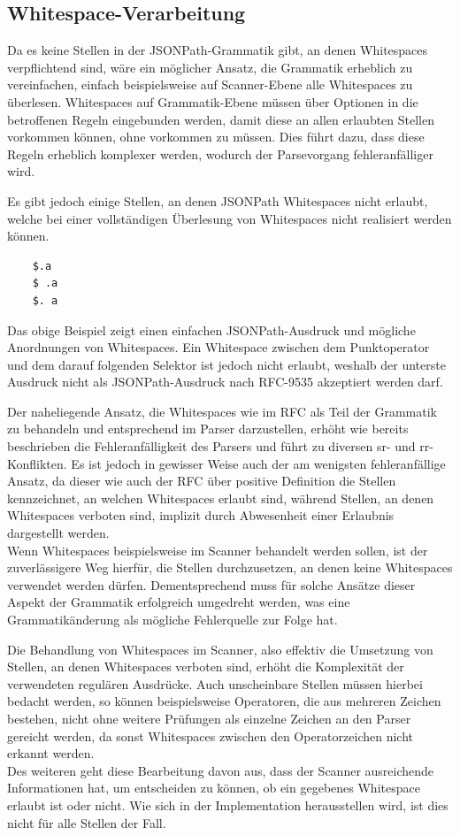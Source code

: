 \documentclass[oneside]{ausarbeitung}
\begin{document}
\subsection{Whitespace-Verarbeitung}

Da es keine Stellen in der JSONPath-Grammatik gibt, an denen Whitespaces verpflichtend sind, wäre ein möglicher Ansatz, die Grammatik erheblich zu vereinfachen, einfach beispielsweise auf Scanner-Ebene alle Whitespaces zu überlesen. Whitespaces auf Grammatik-Ebene müssen über Optionen in die betroffenen Regeln eingebunden werden, damit diese an allen erlaubten Stellen vorkommen können, ohne vorkommen zu müssen. Dies führt dazu, dass diese Regeln erheblich komplexer werden, wodurch der Parsevorgang fehleranfälliger wird. 

Es gibt jedoch einige Stellen, an denen JSONPath Whitespaces nicht erlaubt, welche bei einer vollständigen Überlesung von Whitespaces nicht realisiert werden können. 

\pagebreak

\begin{lstlisting}
	$.a
	$ .a
	$. a
\end{lstlisting}

Das obige Beispiel zeigt einen einfachen JSONPath-Ausdruck und mögliche Anordnungen von Whitespaces. Ein Whitespace zwischen dem Punktoperator und dem darauf folgenden Selektor ist jedoch nicht erlaubt, weshalb der unterste Ausdruck nicht als JSONPath-Ausdruck nach RFC-9535 akzeptiert werden darf.

Der naheliegende Ansatz, die Whitespaces wie im RFC als Teil der Grammatik zu behandeln und entsprechend im Parser darzustellen, erhöht wie bereits beschrieben die Fehleranfälligkeit des Parsers und führt zu diversen \ac{sr}- und \ac{rr}-Konflikten. Es ist jedoch in gewisser Weise auch der am wenigsten fehleranfällige Ansatz, da dieser wie auch der RFC über positive Definition die Stellen kennzeichnet, an welchen Whitespaces erlaubt sind, während Stellen, an denen Whitespaces verboten sind, implizit durch Abwesenheit einer Erlaubnis dargestellt werden. \\
Wenn Whitespaces beispielsweise im Scanner behandelt werden sollen, ist der zuverlässigere Weg hierfür, die Stellen durchzusetzen, an denen keine Whitespaces verwendet werden dürfen. Dementsprechend muss für solche Ansätze dieser Aspekt der Grammatik erfolgreich umgedreht werden, was eine Grammatikänderung als mögliche Fehlerquelle zur Folge hat.

Die Behandlung von Whitespaces im Scanner, also effektiv die Umsetzung von Stellen, an denen Whitespaces verboten sind, erhöht die Komplexität der verwendeten regulären Ausdrücke. Auch unscheinbare Stellen müssen hierbei bedacht werden, so können beispielsweise Operatoren, die aus mehreren Zeichen bestehen, nicht ohne weitere Prüfungen als einzelne Zeichen an den Parser gereicht werden, da sonst Whitespaces zwischen den Operatorzeichen nicht erkannt werden. \\
Des weiteren geht diese Bearbeitung davon aus, dass der Scanner ausreichende Informationen hat, um entscheiden zu können, ob ein gegebenes Whitespace erlaubt ist oder nicht. Wie sich in der Implementation herausstellen wird, ist dies nicht für alle Stellen der Fall.
\end{document}
